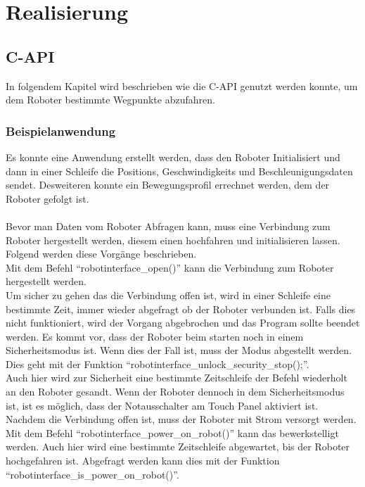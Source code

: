 \chapter{Realisierung}
\label{chap:umsetzung}

\section{C-API}
\label{sec:capi_rel}

In folgendem Kapitel wird beschrieben wie die C-API genutzt werden konnte, um dem Roboter bestimmte Wegpunkte abzufahren.

\subsection{Beispielanwendung}
\label{sub:capi-problems_rel}

Es konnte eine Anwendung erstellt werden, dass den Roboter Initialisiert und dann in einer Schleife die Positions, Geschwindigkeits und Beschleunigungsdaten sendet. Desweiteren konnte ein Bewegungsprofil errechnet werden, dem der Roboter gefolgt ist. 
\\\\
Bevor man Daten vom Roboter Abfragen kann, muss eine Verbindung zum Roboter hergestellt werden, diesem einen hochfahren und initialisieren lassen. Folgend werden diese Vorgänge beschrieben.\\
Mit dem Befehl ``robotinterface\_open()'' kann die Verbindung zum Roboter hergestellt werden.
\\
Um sicher zu gehen das die Verbindung offen ist, wird in einer Schleife eine bestimmte Zeit, immer wieder abgefragt ob der Roboter verbunden ist. Falls dies nicht funktioniert, wird der Vorgang abgebrochen und das Program sollte beendet werden. Es kommt vor, dass der Roboter beim starten noch in einem Sicherheitsmodus ist. Wenn dies der Fall ist, muss der Modus abgestellt werden. Dies geht mit der Funktion ``robotinterface\_unlock\_security\_stop();''.
\\
Auch hier wird zur Sicherheit eine bestimmte Zeitschleife der Befehl wiederholt an den Roboter gesandt. Wenn der Roboter dennoch in dem Sicherheitsmodus ist, ist es möglich, dass der Notausschalter am Touch Panel aktiviert ist.
Nachdem die Verbindung offen ist, muss der Roboter mit Strom versorgt werden. Mit dem Befehl ``robotinterface\_power\_on\_robot()'' kann das bewerkstelligt werden. Auch hier wird eine bestimmte Zeitschleife abgewartet, bis der Roboter hochgefahren ist. Abgefragt werden kann dies mit der Funktion ``robotinterface\_is\_power\_on\_robot()''.

